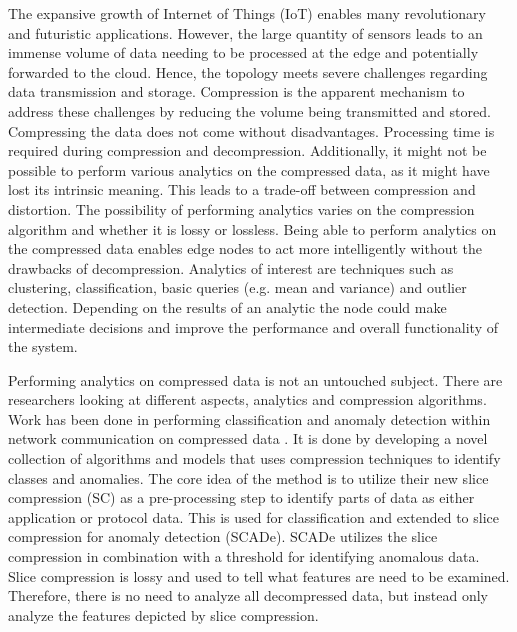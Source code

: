 The expansive growth of Internet of Things (IoT) enables many revolutionary and futuristic applications. However, the large quantity of sensors leads to an immense volume of data needing to be processed at the edge and potentially forwarded to the cloud. Hence, the topology meets severe challenges regarding data transmission and storage. Compression is the apparent mechanism to address these challenges by reducing the volume being transmitted and stored. Compressing the data does not come without disadvantages. Processing time is required during compression and decompression. Additionally, it might not be possible to perform various analytics on the compressed data, as it might have lost its intrinsic meaning. This leads to a trade-off between compression and distortion\cite{anomaly-det-compressed}.  The possibility of performing analytics varies on the compression algorithm and whether it is lossy or lossless. Being able to perform analytics on the compressed data enables edge nodes to act more intelligently without the drawbacks of decompression. Analytics of interest are techniques such as clustering, classification, basic queries (e.g. mean and variance) and outlier detection. Depending on the results of an analytic the node could make intermediate decisions and improve the performance and overall functionality of the system.      

Performing analytics on compressed data is not an untouched subject. There are researchers looking at different aspects, analytics and compression algorithms. Work has been done in performing classification and anomaly detection within network communication on compressed data \cite{related-1}. It is done by developing a novel collection of algorithms and models that uses compression techniques to identify classes and anomalies. The core idea of the method is to utilize their new slice compression (SC) as a pre-processing step to identify parts of data as either application or protocol data. This is used for classification and extended to slice compression for anomaly detection (SCADe). SCADe utilizes the slice compression in combination with a threshold for identifying anomalous data. Slice compression is lossy and used to tell what features are need to be examined. Therefore, there is no need to analyze all decompressed data, but instead only analyze the features depicted by slice compression.

